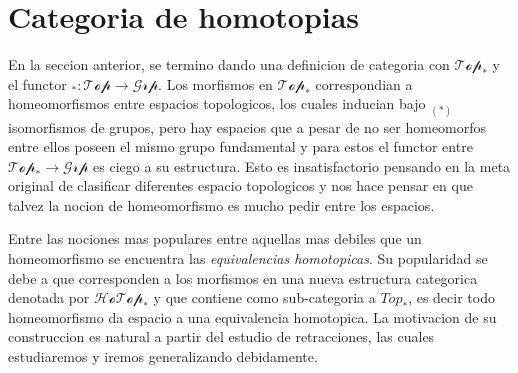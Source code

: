 \section{Categoria de homotopias}
En la seccion anterior, se termino dando una definicion de categoria con
\(\mathscr{Top}_*\) y el functor \(_{{*}} : \mathscr{Top} \to
\mathscr{Grp}\). Los morfismos en \(\mathscr{Top}_*\) correspondian a
homeomorfismos entre espacios topologicos, los cuales inducian bajo
\(_{(*)}\) isomorfismos de grupos, pero hay espacios que a pesar de no
ser homeomorfos entre ellos poseen el mismo grupo fundamental y para
estos el functor entre \(\mathscr{Top}_* \to \mathscr{Grp}\) es ciego a
su estructura. Esto es insatisfactorio pensando en la meta
original de clasificar diferentes espacio topologicos y nos hace pensar
en que talvez la nocion de homeomorfismo es mucho pedir entre los
espacios.

Entre las nociones mas populares entre aquellas mas debiles que un
homeomorfismo se encuentra las \emph{equivalencias homotopicas}. Su
popularidad se debe a que corresponden a los morfismos en una nueva
estructura categorica denotada por \(\mathscr{HoTop}_*\) y que contiene
como sub-categoria a \(Top_*\), es decir todo homeomorfismo da espacio a
una equivalencia homotopica. La motivacion de su construccion es natural
a partir del estudio de retracciones, las cuales estudiaremos y iremos
generalizando debidamente.

